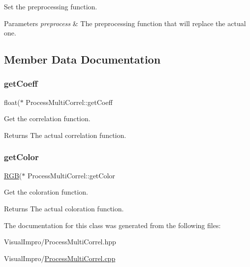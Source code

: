 Set the preprocessing function. 


\begin{DoxyParams}{Parameters}
{\em preprocess} & The preprocessing function that will replace the actual one. \\
\hline
\end{DoxyParams}


\subsection{Member Data Documentation}
\mbox{\label{class_process_multi_correl_a5f932eae352e210a865fa7391ff0e06e}} 
\subsubsection{\texorpdfstring{get\+Coeff}{getCoeff}}
{\footnotesize\ttfamily float($\ast$ Process\+Multi\+Correl\+::get\+Coeff\hspace{0.3cm}{\ttfamily [inline]}}



Get the correlation function. 

\begin{DoxyReturn}{Returns}
The actual correlation function. 
\end{DoxyReturn}
\mbox{\label{class_process_multi_correl_a027833084b3b78a363c205ad1020ac8c}} 
\subsubsection{\texorpdfstring{get\+Color}{getColor}}
{\footnotesize\ttfamily \mbox{\hyperlink{class_r_g_b}{R\+GB}}($\ast$ Process\+Multi\+Correl\+::get\+Color\hspace{0.3cm}{\ttfamily [inline]}}



Get the coloration function. 

\begin{DoxyReturn}{Returns}
The actual coloration function. 
\end{DoxyReturn}


The documentation for this class was generated from the following files\+:\begin{DoxyCompactItemize}
\item 
Visual\+Impro/Process\+Multi\+Correl.\+hpp\item 
Visual\+Impro/\mbox{\hyperlink{_process_multi_correl_8cpp}{Process\+Multi\+Correl.\+cpp}}\end{DoxyCompactItemize}
